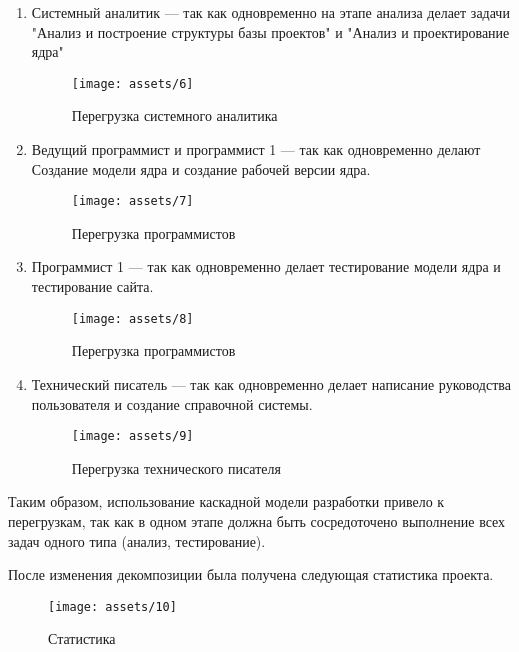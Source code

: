 \begin{enumerate}
	\item Системный аналитик --- так как одновременно на этапе анализа делает задачи "Анализ и построение структуры базы проектов" и "Анализ и проектирование ядра"
	
	\begin{figure}[H]
    \begin{center}
    \texttt{[image: assets/6]}
    \caption{Перегрузка системного аналитика}
    \label{fig:6}
    \end{center}
	\end{figure}
	
	\item Ведущий программист и программист 1 --- так как одновременно делают Создание модели ядра и создание рабочей версии ядра.
	
	\begin{figure}[H]
    \begin{center}
    \texttt{[image: assets/7]}
    \caption{Перегрузка программистов}
    \label{fig:7}
    \end{center}
	\end{figure}
	
	\item Программист 1 --- так как одновременно делает тестирование модели ядра и тестирование сайта.
	
	\begin{figure}[H]
    \begin{center}
    \texttt{[image: assets/8]}
    \caption{Перегрузка программистов}
    \label{fig:8}
    \end{center}
	\end{figure}
	
	\item Технический писатель --- так как одновременно делает написание руководства пользователя и создание справочной системы.
	
	\begin{figure}[H]
    \begin{center}
    \texttt{[image: assets/9]}
    \caption{Перегрузка технического писателя}
    \label{fig:9}
    \end{center}
	\end{figure}
\end{enumerate}

Таким образом, использование каскадной модели разработки привело к перегрузкам, так как в одном этапе должна быть сосредоточено выполнение всех задач одного типа (анализ, тестирование).

После изменения декомпозиции была получена следующая статистика проекта.

\begin{figure}[H]
    \begin{center}
    \texttt{[image: assets/10]}
    \caption{Статистика}
    \label{fig:10}
    \end{center}
	\end{figure}
